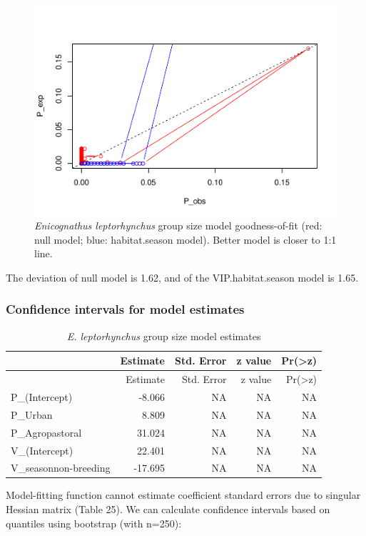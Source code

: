 \documentclass[]{article}
\begin{document}
\begin{figure}[H]
\includegraphics{Patagonia_parrots_density_analysis_files/figure-latex/unnamed-chunk-33-1} \caption{\textit{Enicognathus leptorhynchus} group size model goodness-of-fit (red: null model; blue: habitat.season model). Better model is closer to 1:1 line.}\label{fig:unnamed-chunk-33}
\end{figure}

The deviation of null model is 1.62, and of the VIP.habitat.season model
is 1.65.

\subsubsection{Confidence intervals for model
estimates}\label{confidence-intervals-for-model-estimates-1}

\begin{longtable}[]{@{}lrrrr@{}}
\caption{\textit{E. leptorhynchus} group size model
estimates}\tabularnewline
\toprule
& Estimate & Std. Error & z value &
Pr(\textgreater{}\textbar{}z\textbar{})\tabularnewline
\midrule
\endfirsthead
\toprule
& Estimate & Std. Error & z value &
Pr(\textgreater{}\textbar{}z\textbar{})\tabularnewline
\midrule
\endhead
P\_(Intercept) & -8.066 & NA & NA & NA\tabularnewline
P\_Urban & 8.809 & NA & NA & NA\tabularnewline
P\_Agropastoral & 31.024 & NA & NA & NA\tabularnewline
V\_(Intercept) & 22.401 & NA & NA & NA\tabularnewline
V\_seasonnon-breeding & -17.695 & NA & NA & NA\tabularnewline
\bottomrule
\end{longtable}

Model-fitting function cannot estimate coefficient standard errors due
to singular Hessian matrix (Table 25). We can calculate confidence
intervals based on quantiles using bootstrap (with n=250):
\end{document}
